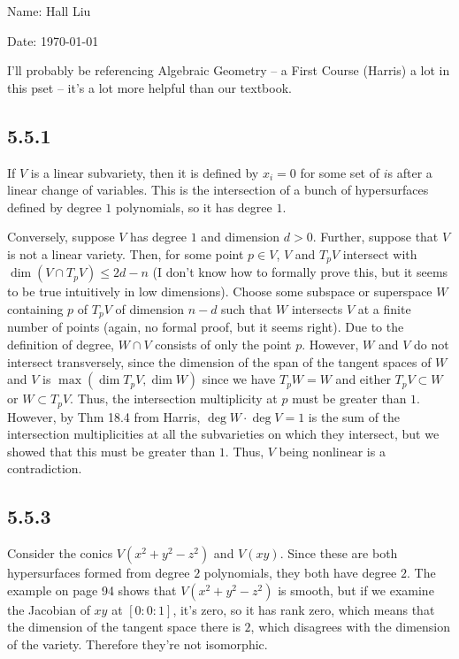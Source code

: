 \documentclass{article}
\begin{document}
Name: Hall Liu

Date: \today 
\vspace{1.5cm}

I'll probably be referencing Algebraic Geometry -- a First Course (Harris) a lot in this pset -- it's a lot more helpful than our textbook.
\subsection*{5.5.1}
If $V$ is a linear subvariety, then it is defined by $x_i=0$ for some set of $i$s after a linear change of variables. This is the intersection of a bunch of hypersurfaces defined by degree $1$ polynomials, so it has degree $1$.

Conversely, suppose $V$ has degree $1$ and dimension $d>0$. Further, suppose that $V$ is not a linear variety. Then, for some point $p\in V$, $V$ and $T_pV$ intersect with $\dim(V\cap T_pV)\leq 2d-n$ (I don't know how to formally prove this, but it seems to be true intuitively in low dimensions). Choose some subspace or superspace $W$ containing $p$ of $T_pV$ of dimension $n-d$ such that $W$ intersects $V$ at a finite number of points (again, no formal proof, but it seems right). Due to the definition of degree, $W\cap V$ consists of only the point $p$. However, $W$ and $V$ do not intersect transversely, since the dimension of the span of the tangent spaces of $W$ and $V$ is $\max(\dim T_pV, \dim W)$ since we have $T_pW=W$ and either $T_pV\subset W$ or $W\subset T_pV$. Thus, the intersection multiplicity at $p$ must be greater than $1$. However, by Thm 18.4 from Harris, $\deg W\cdot\deg V=1$ is the sum of the intersection multiplicities at all the subvarieties on which they intersect, but we showed that this must be greater than $1$. Thus, $V$ being nonlinear is a contradiction.
\subsection*{5.5.3}
Consider the conics $V(x^2+y^2-z^2)$ and $V(xy)$. Since these are both hypersurfaces formed from degree $2$ polynomials, they both have degree $2$. The example on page 94 shows that $V(x^2+y^2-z^2)$ is smooth, but if we examine the Jacobian of $xy$ at $[0:0:1]$, it's zero, so it has rank zero, which means that the dimension of the tangent space there is $2$, which disagrees with the dimension of the variety. Therefore they're not isomorphic.
\end{document}
